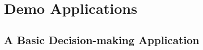 \documentclass[thesis.tex]{subfiles}
\begin{document}
\chapter{Demo Applications}

\section{A Basic Decision-making Application}
\end{document}
